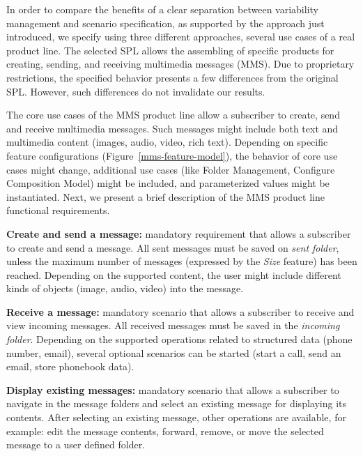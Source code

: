 \documentclass{acm_proc_article-sp}
\begin{document}
In order to compare the benefits of a clear separation between variability management and scenario specification, as supported by the approach just introduced, we specify using three different approaches, several use cases of a real product line. The selected SPL allows the assembling of specific products for creating, sending, and receiving multimedia messages (MMS). Due to proprietary restrictions, the specified behavior presents a few differences from the original SPL. However, such differences do not invalidate our results.

The core use cases of the MMS product line allow a subscriber to create, send and receive multimedia messages. Such messages might include both text and multimedia content (images, audio, video, rich text). Depending on specific feature configurations (Figure~\ref{mms-feature-model}), the behavior of core use cases might change, additional use cases (like Folder Management, Configure Composition Model) might be included, and parameterized values might be instantiated. Next, we present a brief description of the MMS product line functional requirements.

{\bf Create and send a message:} mandatory requirement that allows a subscriber to create and send a message. All sent messages must be saved on \emph{sent folder}, unless the maximum number of messages (expressed by the \emph{Size} feature) has been reached. Depending on the supported content, the user might include different kinds of objects (image, audio, video) into the message. 


{\bf Receive a message:} mandatory scenario that allows a subscriber to receive and view incoming messages. All received messages must be saved in the \emph{incoming folder}. Depending on the supported operations related to structured data (phone number, email), several optional scenarios can be started (start a call, send an email, store phonebook data).

{\bf Display existing messages:} mandatory scenario that allows a subscriber to navigate in the message folders and select an existing message for displaying its contents. After selecting an existing message, other operations are available, for example: edit the message contents, forward, remove, or move the selected message to a user defined folder. 
\end{document}

